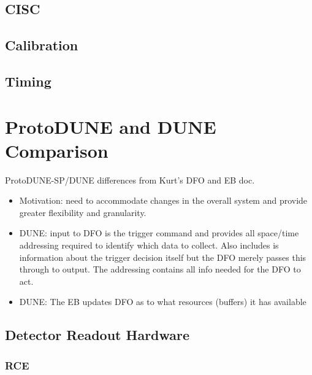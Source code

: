 \subsection{CISC}
\label{sec:sp-daq:interfaces-cisc}
\subsection{Calibration}
\subsection{Timing}

\section{ProtoDUNE and DUNE Comparison}


ProtoDUNE-SP/DUNE differences from Kurt's DFO and EB doc.
\begin{itemize}
\item Motivation: need to accommodate changes in the overall system and provide greater flexibility and granularity.
\item DUNE: input to DFO is the trigger command and provides all space/time addressing required to identify which data to collect.  Also includes is information about the trigger decision itself but the DFO merely passes this through to output.  The addressing contains all info needed for the DFO to act.
\item DUNE: The EB updates DFO as to what resources (buffers) it has available
\end{itemize}

\subsection{Detector Readout Hardware}


\subsubsection{RCE}

